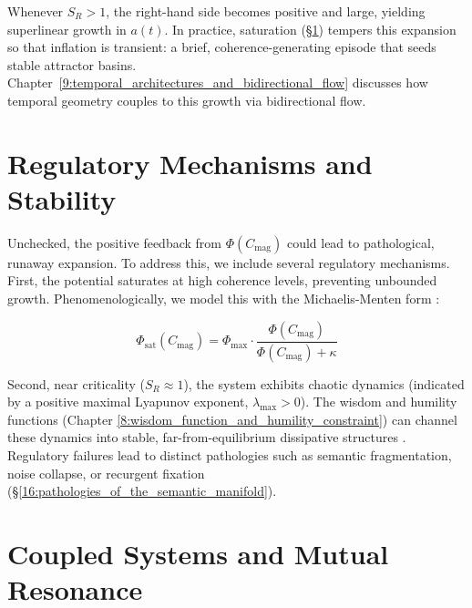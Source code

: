 Whenever \(S_R>1\), the right-hand side becomes positive and large, yielding superlinear growth in \(a(t)\). In practice, saturation (\S\ref{7.4:regulatory_mechanisms_and_stability}) tempers this expansion so that inflation is transient: a brief, coherence-generating episode that seeds stable attractor basins. Chapter~\ref{9:temporal_architectures_and_bidirectional_flow} discusses how temporal geometry couples to this growth via bidirectional flow.


\section{Regulatory Mechanisms and Stability}
\label{7.4:regulatory_mechanisms_and_stability}

Unchecked, the positive feedback from \(\Phi(C_{\mathrm{mag}})\) could lead to pathological, runaway expansion. To address this, we include several regulatory mechanisms. First, the potential saturates at high coherence levels, preventing unbounded growth. Phenomenologically, we model this with the Michaelis-Menten form \autocite{MichaelisMenten1913}:

\begin{equation}
\Phi_{\text{sat}}(C_{\mathrm{mag}}) = \Phi_{\text{max}} \cdot \frac{\Phi(C_{\mathrm{mag}})}{\Phi(C_{\mathrm{mag}}) + \kappa}
\end{equation}

Second, near criticality (\(S_R \approx 1\)), the system exhibits chaotic dynamics (indicated by a positive maximal Lyapunov exponent, \(\lambda_{\text{max}} > 0\)). The wisdom and humility functions (Chapter \ref{8:wisdom_function_and_humility_constraint}) can channel these dynamics into stable, far-from-equilibrium dissipative structures \autocite{PrigogineStengers1984}. Regulatory failures lead to distinct pathologies such as semantic fragmentation, noise collapse, or recurgent fixation (\S\ref{16:pathologies_of_the_semantic_manifold}).


\section{Coupled Systems and Mutual Resonance}
\label{7.5:coupled_systems_and_mutual_resonance}


